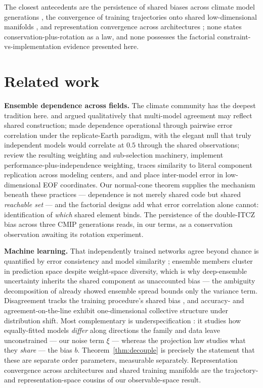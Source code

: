 \documentclass[11pt]{article}
\begin{document}
The closest antecedents are the persistence of shared biases across climate
model generations \citep{tian2020,knutti2013}, the convergence of training
trajectories onto shared low-dimensional manifolds \citep{mao2024}, and
representation convergence across architectures \citep{huh2024}; none states
conservation-plus-rotation as a law, and none possesses the factorial
constraint-vs-implementation evidence presented here.

\section{Related work}
\label{sec:related}

\textbf{Ensemble dependence across fields.} The climate community has the
deepest tradition here. \citet{pirtle2010} and \citet{parker2011} argued
qualitatively that multi-model agreement may reflect shared construction;
\citet{bishop2013} made dependence operational through pairwise error
correlation under the replicate-Earth paradigm, with the elegant null that
truly independent models would correlate at $0.5$ through the shared
observations; \citet{abramowitz2019} review the resulting weighting and
sub-selection machinery, \citet{knutti2017} implement
performance-plus-independence weighting, \citet{boe2018} traces similarity to
literal component replication across modeling centers, and
\citet{sanderson2015} and \citet{brands2022} place inter-model error in
low-dimensional EOF coordinates. Our normal-cone theorem supplies the
mechanism beneath these practices --- dependence is not merely shared code but
shared \emph{reachable set} --- and the factorial designs add what error
correlation alone cannot: identification of \emph{which} shared element binds.
The persistence of the double-ITCZ bias across three CMIP generations
\citep{tian2020} reads, in our terms, as a conservation observation awaiting
its rotation experiment.

\textbf{Machine learning.} That independently trained networks agree beyond
chance is quantified by error consistency \citep{geirhos2020} and model
similarity \citep{mania2019}; ensemble members cluster in prediction space
\citep{fort2019} despite weight-space diversity, which is why deep-ensemble
uncertainty \citep{lakshminarayanan2017} inherits the shared component as
unaccounted bias --- the ambiguity decomposition of \citet{krogh1995} already
showed ensemble spread bounds only the variance term. Disagreement tracks the
training procedure's shared bias \citep{jiang2021}, and accuracy- and
agreement-on-the-line \citep{miller2021,baek2022} exhibit one-dimensional
collective structure under distribution shift. Most complementary is
underspecification \citep{damour2022}: it studies how equally-fitted models
\emph{differ} along directions the family and data leave unconstrained --- our
noise term $\xi$ --- whereas the projection law studies what they
\emph{share} --- the bias $b$. Theorem~\ref{thm:decouple} is precisely the
statement that these are separate order parameters, measurable separately.
Representation convergence across architectures \citep{huh2024} and shared
training manifolds \citep{mao2024} are the trajectory- and
representation-space cousins of our observable-space result.
\end{document}
